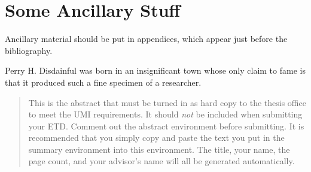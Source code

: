 \documentclass[12pt]{gatech-thesis}
\begin{document}





\nocite{*}
\appendix
\chapter{Some Ancillary Stuff}

Ancillary material should be put in appendices, which 
appear just before the bibliography. 

\begin{postliminary}
{}
\begin{vita}
Perry H. Disdainful was born in an insignificant town
whose only claim to fame is that it produced such a fine
specimen of a researcher.
\end{vita}
\end{postliminary}

\begin{abstract}
  This is the abstract that must be turned in as hard copy to the
  thesis office to meet the UMI requirements. It should \emph{not} be
  included when submitting your ETD. Comment out the abstract
  environment before submitting. It is recommended that you simply
  copy and paste the text you put in the summary environment into this
  environment. The title, your name, the page count, and your
  advisor's name will all be generated automatically.
\end{abstract}
\end{document}
